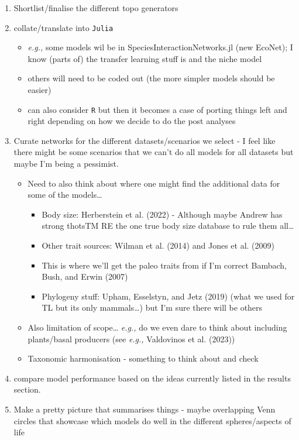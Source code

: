 \documentclass[
  letterpaper,
  DIV=11,
  numbers=noendperiod]{scrartcl}
\providecommand{\tightlist}{%
  \setlength{\itemsep}{0pt}\setlength{\parskip}{0pt}}\usepackage{longtable,booktabs,array}
\begin{document}
\begin{enumerate}
\def\labelenumi{\arabic{enumi}.}
\tightlist
\item
  Shortlist/finalise the different topo generators
\item
  collate/translate into \texttt{Julia}

  \begin{itemize}
  \tightlist
  \item
    \emph{e.g.,} some models wil be in SpeciesInteractionNetworks.jl
    (new EcoNet); I know (parts of) the transfer learning stuff is and
    the niche model
  \item
    others will need to be coded out (the more simpler models should be
    easier)
  \item
    can also consider \texttt{R} but then it becomes a case of porting
    things left and right depending on how we decide to do the post
    analyses
  \end{itemize}
\item
  Curate networks for the different datasets/scenarios we select - I
  feel like there might be some scenarios that we can't do all models
  for all datasets but maybe I'm being a pessimist.

  \begin{itemize}
  \tightlist
  \item
    Need to also think about where one might find the additional data
    for some of the models\ldots{}

    \begin{itemize}
    \tightlist
    \item
      Body size: Herberstein et al. (2022) - Although maybe Andrew has
      strong thotsTM RE the one true body size database to rule them
      all\ldots{}
    \item
      Other trait sources: Wilman et al. (2014) and Jones et al. (2009)
    \item
      This is where we'll get the paleo traits from if I'm correct
      Bambach, Bush, and Erwin (2007)
    \item
      Phylogeny stuff: Upham, Esselstyn, and Jetz (2019) (what we used
      for TL but its only mammals\ldots) but I'm sure there will be
      others
    \end{itemize}
  \item
    Also limitation of scope\ldots{} \emph{e.g.,} do we even dare to
    think about including plants/basal producers (see \emph{e.g.,}
    Valdovinos et al. (2023))
  \item
    Taxonomic harmonisation - something to think about and check
  \end{itemize}
\item
  compare model performance based on the ideas currently listed in the
  results section.
\item
  Make a pretty picture that summarises things - maybe overlapping Venn
  circles that showcase which models do well in the different
  spheres/aspects of life
\end{enumerate}
\end{document}
